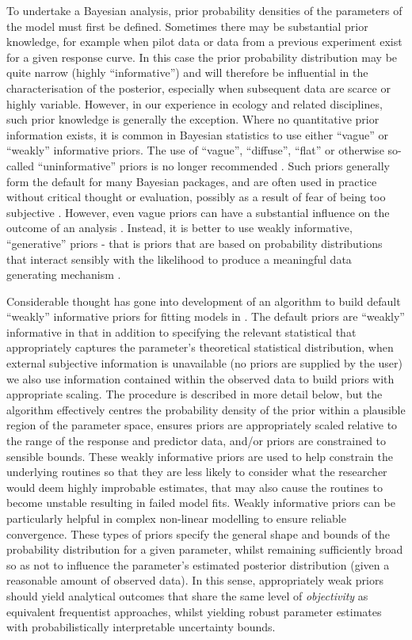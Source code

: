 \documentclass[
  shortnames]{jss}
\begin{document}
To undertake a Bayesian analysis, prior probability densities of the parameters of the model must first be defined. Sometimes there may be substantial prior knowledge, for example when pilot data or data from a previous experiment exist for a given response curve. In this case the prior probability distribution may be quite narrow (highly ``informative'') and will therefore be influential in the characterisation of the posterior, especially when subsequent data are scarce or highly variable. However, in our experience in ecology and related disciplines, such prior knowledge is generally the exception. Where no quantitative prior information exists, it is common in Bayesian statistics to use either ``vague'' or ``weakly'' informative priors. The use of ``vague'', ``diffuse'', ``flat'' or otherwise so-called ``uninformative'' priors is no longer recommended \citep{Banner2020}. Such priors generally form the default for many Bayesian packages, and are often used in practice without critical thought or evaluation, possibly as a result of fear of being too subjective \citep{Banner2020}. However, even vague priors can have a substantial influence on the outcome of an analysis \citep{depaoli2020importance, gelman2017entropy}. Instead, it is better to use weakly informative, ``generative'' priors - that is priors that are based on probability distributions that interact sensibly with the likelihood to produce a meaningful data generating mechanism \citep{gelman2017entropy}.

Considerable thought has gone into development of an algorithm to build default ``weakly'' informative priors for fitting models in . The default priors are ``weakly'' informative in that in addition to specifying the relevant statistical  that appropriately captures the parameter's theoretical statistical distribution, when external
subjective information is unavailable (no priors are supplied by the user) we also use information contained within the observed data to build priors with appropriate scaling. The procedure is described in more detail below, but the algorithm effectively centres the probability density of the prior within a plausible region of the parameter space, ensures priors are appropriately scaled relative to the range of the response and predictor data, and/or priors are constrained to sensible bounds. These weakly informative priors are used to help constrain the underlying routines so that they are less likely to consider what the researcher would deem highly improbable estimates, that may also cause the routines to become unstable resulting in failed model fits. Weakly informative priors can be particularly helpful in complex non-linear modelling to ensure reliable convergence. These types of priors specify the general shape and bounds of the probability distribution for a given parameter, whilst remaining sufficiently broad so as not to influence the parameter's estimated posterior distribution (given a reasonable amount of observed data). In this sense, appropriately weak priors should yield analytical outcomes that share the same level of \emph{objectivity} as equivalent frequentist approaches, whilst yielding robust parameter estimates with probabilistically interpretable uncertainty bounds.
\end{document}
